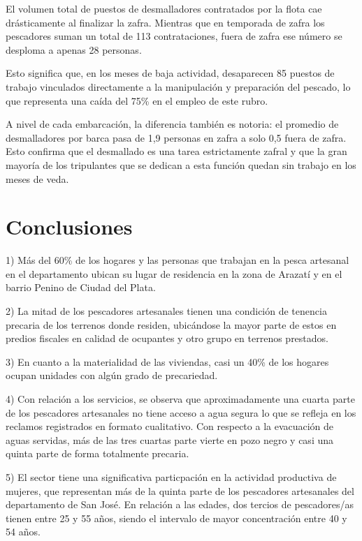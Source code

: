 \documentclass[
  letterpaper,
  DIV=11,
  numbers=noendperiod,
  justified]{scrreprt}
\begin{document}
El volumen total de puestos de desmalladores contratados por la flota
cae drásticamente al finalizar la zafra. Mientras que en temporada de
zafra los pescadores suman un total de 113 contrataciones, fuera de
zafra ese número se desploma a apenas 28 personas.

Esto significa que, en los meses de baja actividad, desaparecen 85
puestos de trabajo vinculados directamente a la manipulación y
preparación del pescado, lo que representa una caída del 75\% en el
empleo de este rubro.

A nivel de cada embarcación, la diferencia también es notoria: el
promedio de desmalladores por barca pasa de 1,9 personas en zafra a solo
0,5 fuera de zafra. Esto confirma que el desmallado es una tarea
estrictamente zafral y que la gran mayoría de los tripulantes que se
dedican a esta función quedan sin trabajo en los meses de veda.

\hypertarget{conclusiones}{%
\chapter{Conclusiones}\label{conclusiones}}

1) Más del 60\% de los hogares y las personas que trabajan en la pesca
artesanal en el departamento ubican su lugar de residencia en la zona de
Arazatí y en el barrio Penino de Ciudad del Plata.

2) La mitad de los pescadores artesanales tienen una condición de
tenencia precaria de los terrenos donde residen, ubicándose la mayor
parte de estos en predios fiscales en calidad de ocupantes y otro grupo
en terrenos prestados.

3) En cuanto a la materialidad de las viviendas, casi un 40\% de los
hogares ocupan unidades con algún grado de precariedad.

4) Con relación a los servicios, se observa que aproximadamente una
cuarta parte de los pescadores artesanales no tiene acceso a agua segura
lo que se refleja en los reclamos registrados en formato cualitativo.
Con respecto a la evacuación de aguas servidas, más de las tres cuartas
parte vierte en pozo negro y casi una quinta parte de forma totalmente
precaria.

5) El sector tiene una significativa particpación en la actividad
productiva de mujeres, que representan más de la quinta parte de los
pescadores artesanales del departamento de San José. En relación a las
edades, dos tercios de pescadores/as tienen entre 25 y 55 años, siendo
el intervalo de mayor concentración entre 40 y 54 años.
\end{document}
